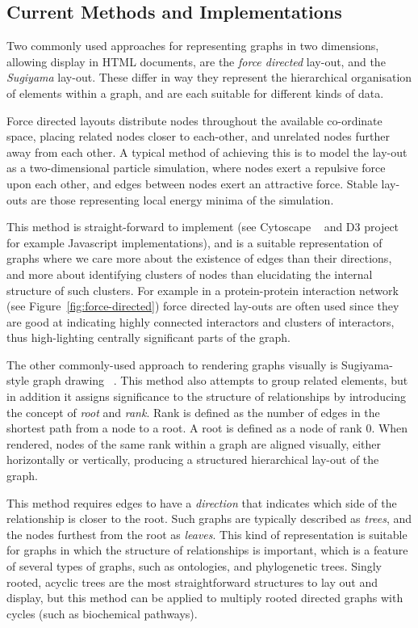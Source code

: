 \documentclass[10pt,a4paper,twocolumn]{article}
\begin{document}
\subsection*{Current Methods and Implementations}

Two commonly used approaches for representing graphs in two dimensions, allowing
display in HTML documents, are the \emph{force directed} lay-out, and the
\emph{Sugiyama} lay-out. These differ in way they represent the hierarchical
organisation of elements within a graph, and are each suitable for different
kinds of data.

Force directed layouts distribute nodes throughout the available co-ordinate
space, placing related nodes closer to each-other, and unrelated nodes further
away from each other. A typical method of achieving this is to model the lay-out
as a two-dimensional particle simulation, where nodes exert a repulsive force
upon each other, and edges between nodes exert an attractive force. Stable
lay-outs are those representing local energy minima of the simulation. 

This method is straight-forward to implement (see Cytoscape ~\cite{cytoscape}
and D3 project ~\cite{d3} for example Javascript implementations), and is a
suitable representation of graphs where we care more about the existence of
edges than their directions, and more about identifying clusters of nodes than
elucidating the internal structure of such clusters. For example in a
protein-protein interaction network (see Figure~\ref{fig:force-directed}) force
directed lay-outs are often used since they are good at indicating highly
connected interactors and clusters of interactors, thus high-lighting centrally
significant parts of the graph. 

The other commonly-used approach to rendering graphs visually is Sugiyama-style
graph drawing ~\cite{sugiyama}. This method also attempts to group related
elements, but in addition it assigns significance to the structure of
relationships by introducing the concept of \emph{root} and \emph{rank}. Rank is
defined as the number of edges in the shortest path from a node to a root. A
root is defined as a node of rank 0. When rendered, nodes of the same rank
within a graph are aligned visually, either horizontally or vertically,
producing a structured hierarchical lay-out of the graph.

This method requires edges to have a \emph{direction} that indicates which side
of the relationship is closer to the root. Such graphs are typically described
as \emph{trees}, and the nodes furthest from the root as \emph{leaves}.  This
kind of representation is suitable for graphs in which the structure of
relationships is important, which is a feature of several types of graphs, such
as ontologies, and phylogenetic trees. Singly rooted, acyclic trees are the most
straightforward structures to lay out and display, but this method can be
applied to multiply rooted directed graphs with cycles (such as biochemical
pathways). 
\end{document}
